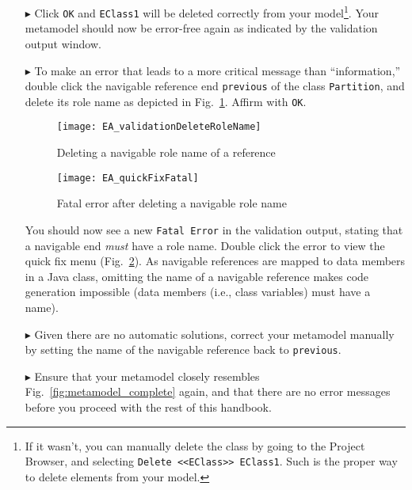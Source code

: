 \begin{enumerate}
\item[$\blacktriangleright$] Click \texttt{OK} and \texttt{EClass1} will be deleted correctly from your model\footnote{If it wasn't, you can manually delete the
class by going to the Project Browser, and selecting \texttt{Delete <<EClass>> EClass1}. Such is the proper way to delete elements from your model.}. Your
metamodel should now be error-free again as indicated by the validation output window.

\item[$\blacktriangleright$] To make an error that leads to a more critical message than ``information,'' double click the navigable reference end
\texttt{previous} of the class \texttt{Partition}, and delete its role name as depicted in Fig.~\ref{fig:delete-role-name}. Affirm with \texttt{OK}.

\begin{figure}[htbp]
    \centering
  \texttt{[image: EA\_validationDeleteRoleName]}
    \caption{Deleting a navigable role name of a reference}
    \label{fig:delete-role-name}
\end{figure}


\begin{figure}[htbp]
	\centering
  \texttt{[image: EA\_quickFixFatal]}
	\caption{Fatal error after deleting a navigable role name}
	\label{fig:fatal-error}
\end{figure}

You should now see a new \texttt{Fatal Error} in the validation output, stating that a navigable end \emph{must} have a role name. Double click the error to
view the quick fix menu (Fig.~\ref{fig:fatal-error}). As navigable references are mapped to data members in a Java class, omitting the name of a navigable
reference makes code generation impossible (data members (i.e., class variables) must have a name).

\item[$\blacktriangleright$] Given there are no automatic solutions, correct your metamodel manually by setting the name of the navigable reference back to
\texttt{previous}.

\item[$\blacktriangleright$] Ensure that your metamodel closely resembles Fig.~\ref{fig:metamodel_complete} again, and that there are no error messages before
you proceed with the rest of this handbook.
\end{enumerate}

